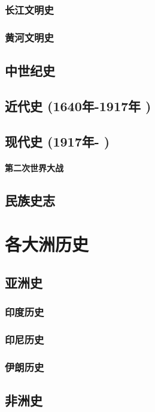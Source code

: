 \documentclass[UTF8]{../RepresentationUniverse}
\begin{document}
    \subsection{长江文明史}
    \subsection{黄河文明史}

\section{中世纪史}
\section{近代史 (1640年-1917年 )}
\section{现代史 (1917年- )}
    \subsubsection{第二次世界大战}
\section{民族史志}






\chapter{各大洲历史}
\section{亚洲史}
    \subsection{印度历史}
    \subsection{印尼历史}
    \subsection{伊朗历史}

\section{非洲史}
\end{document}
